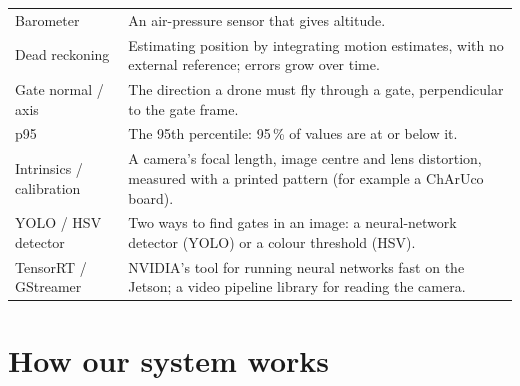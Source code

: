 \documentclass[10pt,a4paper]{article}
\begin{document}
\begin{longtable}{@{}p{3.3cm}p{12.3cm}@{}}
Barometer & An air-pressure sensor that gives altitude. \\
Dead reckoning & Estimating position by integrating motion estimates, with no external reference; errors grow over time. \\
Gate normal / axis & The direction a drone must fly through a gate, perpendicular to the gate frame. \\
p95 & The 95th percentile: 95\,\% of values are at or below it. \\
Intrinsics / calibration & A camera's focal length, image centre and lens distortion, measured with a printed pattern (for example a ChArUco board). \\
YOLO / HSV detector & Two ways to find gates in an image: a neural-network detector (YOLO) or a colour threshold (HSV). \\
TensorRT / GStreamer & NVIDIA's tool for running neural networks fast on the Jetson; a video pipeline library for reading the camera. \\
\bottomrule
\end{longtable}

\section{How our system works}\label{sec:system}
\end{document}
